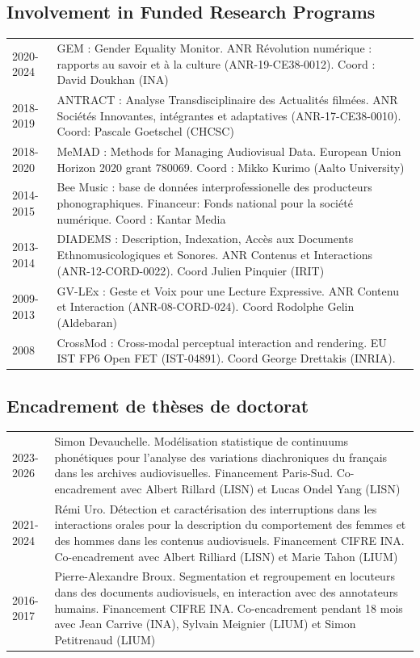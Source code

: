 \begin{en}
\subsection{Involvement in Funded Research Programs}
\begin{tabularx}{\linewidth}{@{}l X@{}}
2020-2024 & GEM : Gender Equality Monitor. ANR Révolution numérique : rapports au savoir et à la culture (ANR-19-CE38-0012). Coord : David Doukhan (INA)\\
2018-2019 & ANTRACT : Analyse Transdisciplinaire des Actualités filmées. ANR Sociétés Innovantes, intégrantes et adaptatives (ANR-17-CE38-0010). Coord: Pascale Goetschel (CHCSC)\\
2018-2020 & MeMAD : Methods for Managing Audiovisual Data. European Union Horizon 2020 grant 780069. Coord : Mikko Kurimo (Aalto University)\\
2014-2015 & Bee Music : base de données interprofessionelle des producteurs phonographiques. Financeur: Fonds national pour la société numérique. Coord : Kantar Media\\
2013-2014 & DIADEMS : Description, Indexation, Accès aux Documents Ethnomusicologiques et Sonores. ANR Contenus et Interactions (ANR-12-CORD-0022). Coord Julien Pinquier (IRIT)\\
2009-2013 & GV-LEx : Geste et Voix pour une Lecture Expressive. ANR Contenu et Interaction (ANR-08-CORD-024). Coord Rodolphe Gelin (Aldebaran)\\
2008 & CrossMod : Cross-modal perceptual interaction and rendering. EU IST FP6 Open FET (IST-04891). Coord George Drettakis (INRIA).\\
\end{tabularx}
\end{en}


\begin{fr}
\subsection{Encadrement de thèses de doctorat}
\begin{tabularx}{\linewidth}{@{}l X@{}}
2023-2026 & Simon Devauchelle. Modélisation statistique de continuums phonétiques pour l'analyse des variations diachroniques du français dans les archives audiovisuelles. Financement Paris-Sud. Co-encadrement avec Albert Rillard (LISN) et Lucas Ondel Yang (LISN)\\
2021-2024 & Rémi Uro. Détection et caractérisation des interruptions dans les interactions orales pour la description du comportement des femmes et des hommes dans les contenus audiovisuels. Financement CIFRE INA. Co-encadrement avec Albert Rilliard (LISN) et Marie Tahon (LIUM)\\
2016-2017 & Pierre-Alexandre Broux. Segmentation et regroupement en locuteurs dans des documents audiovisuels, en interaction avec des annotateurs humains. Financement CIFRE INA. Co-encadrement pendant 18 mois avec Jean Carrive (INA), Sylvain Meignier (LIUM) et Simon Petitrenaud (LIUM)\\
\end{tabularx}
\end{fr}

